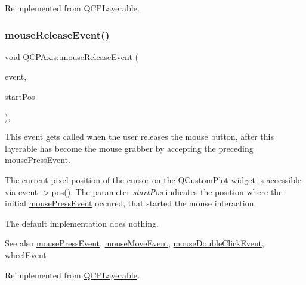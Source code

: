 Reimplemented from \mbox{\hyperlink{class_q_c_p_layerable_af6567604818db90f4fd52822f8bc8376}{Q\+C\+P\+Layerable}}.

\mbox{\label{class_q_c_p_axis_a780bee321fc6476e5fc49c4980291a01}} 
\subsubsection{\texorpdfstring{mouseReleaseEvent()}{mouseReleaseEvent()}}
{\footnotesize\ttfamily void Q\+C\+P\+Axis\+::mouse\+Release\+Event (\begin{DoxyParamCaption}\item[{Q\+Mouse\+Event $\ast$}]{event,  }\item[{const Q\+PointF \&}]{start\+Pos }\end{DoxyParamCaption})\hspace{0.3cm}{\ttfamily [protected]}, {\ttfamily [virtual]}}

This event gets called when the user releases the mouse button, after this layerable has become the mouse grabber by accepting the preceding \mbox{\hyperlink{class_q_c_p_axis_a61bc07cda6193a3fa6b5aa198fc4e4fa}{mouse\+Press\+Event}}.

The current pixel position of the cursor on the \mbox{\hyperlink{class_q_custom_plot}{Q\+Custom\+Plot}} widget is accessible via {\ttfamily event-\/$>$pos()}. The parameter {\itshape start\+Pos} indicates the position where the initial \mbox{\hyperlink{class_q_c_p_axis_a61bc07cda6193a3fa6b5aa198fc4e4fa}{mouse\+Press\+Event}} occured, that started the mouse interaction.

The default implementation does nothing.

\begin{DoxySeeAlso}{See also}
\mbox{\hyperlink{class_q_c_p_axis_a61bc07cda6193a3fa6b5aa198fc4e4fa}{mouse\+Press\+Event}}, \mbox{\hyperlink{class_q_c_p_axis_ac5a269609e6177737faabdc46434d8c7}{mouse\+Move\+Event}}, \mbox{\hyperlink{class_q_c_p_layerable_a4171e2e823aca242dd0279f00ed2de81}{mouse\+Double\+Click\+Event}}, \mbox{\hyperlink{class_q_c_p_axis_aa850f195d7cc470c53809d0fff5e444d}{wheel\+Event}} 
\end{DoxySeeAlso}


Reimplemented from \mbox{\hyperlink{class_q_c_p_layerable_aa0d79b005686f668622bbe66ac03ba2c}{Q\+C\+P\+Layerable}}.

